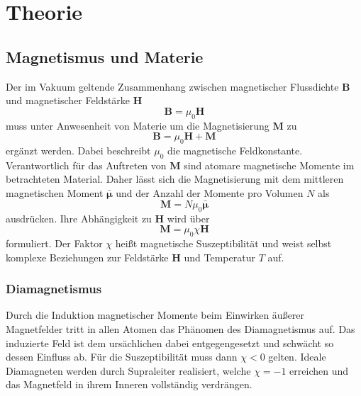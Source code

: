 \section[Theorie]{Theorie \textnormal{\cite{paramagnet}}}
\label{sec:theorie}

\subsection{Magnetismus und Materie}

Der im Vakuum geltende Zusammenhang zwischen magnetischer Flussdichte $\symbf B$ und magnetischer Feldstärke $\symbf H$
\begin{equation*}
	\symbf B = \mu_0 \symbf H
	\label{eqn:vakuum}
\end{equation*}
muss unter Anwesenheit von Materie um die Magnetisierung $\symbf M$ zu
\begin{equation*}
	\symbf B = \mu_0 \symbf H + \symbf M
	\label{eqn:materie}
\end{equation*}
ergänzt werden. Dabei beschreibt $\mu_0$ die magnetische Feldkonstante. Verantwortlich für das Auftreten von $\symbf M$
sind atomare magnetische Momente im betrachteten Material. Daher lässt sich die Magnetisierung mit dem mittleren
magnetischen Moment $\bar{\symbf \mu}$ und der Anzahl der Momente pro Volumen $N$ als
\begin{equation*}
	\symbf M = N \mu_0 \bar{\symbf \mu}
	\label{eqn:magnet_moment}
\end{equation*}
ausdrücken. Ihre Abhängigkeit zu $\symbf H$ wird über
\begin{equation*}
	\symbf M = \mu_0 \chi \symbf H
	\label{eqn:magnet_feld}
\end{equation*}
formuliert. Der Faktor $\chi$ heißt magnetische Suszeptibilität und weist selbst komplexe Beziehungen zur Feldstärke
$\symbf H$ und Temperatur $T$ auf.

\subsubsection{Diamagnetismus}

Durch die Induktion magnetischer Momente beim Einwirken äußerer Magnetfelder tritt in allen Atomen das Phänomen des
Diamagnetismus auf. Das induzierte Feld ist dem ursächlichen dabei entgegengesetzt und schwächt so dessen Einfluss ab.
Für die Suszeptibilität muss dann $\chi < 0 $ gelten. Ideale Diamagneten werden durch Supraleiter realisiert, welche
$\chi = -1$ erreichen und das Magnetfeld in ihrem Inneren vollständig verdrängen.

